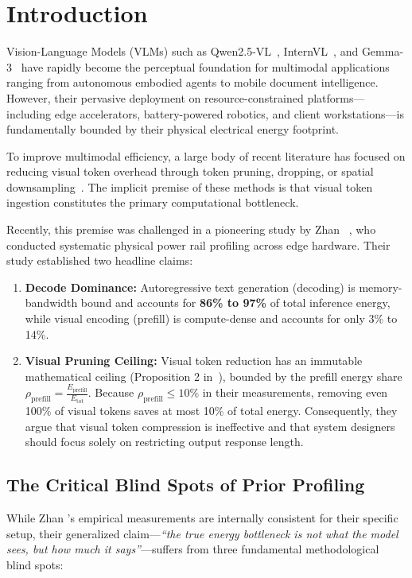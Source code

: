 \section{Introduction}
\label{sec:intro}

Vision-Language Models (VLMs) such as Qwen2.5-VL~\cite{qwen2_5_vl_2025}, InternVL~\cite{chen2024internvl}, and Gemma-3~\cite{gemma3_2025} have rapidly become the perceptual foundation for multimodal applications ranging from autonomous embodied agents to mobile document intelligence. However, their pervasive deployment on resource-constrained platforms---including edge accelerators, battery-powered robotics, and client workstations---is fundamentally bounded by their physical electrical energy footprint.

To improve multimodal efficiency, a large body of recent literature has focused on reducing visual token overhead through token pruning, dropping, or spatial downsampling~\cite{chen2024fastv, zhang2024sparsevlm, yang2024visionzip, vasu2025fastvlm}. The implicit premise of these methods is that visual token ingestion constitutes the primary computational bottleneck.

Recently, this premise was challenged in a pioneering study by Zhan \etal~\cite{zhan2026seeing}, who conducted systematic physical power rail profiling across edge hardware. Their study established two headline claims:
\begin{enumerate}[leftmargin=*]
    \item \textbf{Decode Dominance:} Autoregressive text generation (decoding) is memory-bandwidth bound and accounts for \textbf{86\% to 97\%} of total inference energy, while visual encoding (prefill) is compute-dense and accounts for only 3\% to 14\%.
    \item \textbf{Visual Pruning Ceiling:} Visual token reduction has an immutable mathematical ceiling (Proposition 2 in~\cite{zhan2026seeing}), bounded by the prefill energy share $\rho_{\text{prefill}} = \frac{E_{\text{prefill}}}{E_{\text{tot}}}$. Because $\rho_{\text{prefill}} \le 10\%$ in their measurements, removing even 100\% of visual tokens saves at most 10\% of total energy. Consequently, they argue that visual token compression is ineffective and that system designers should focus solely on restricting output response length.
\end{enumerate}

\subsection{The Critical Blind Spots of Prior Profiling}
While Zhan \etal's empirical measurements are internally consistent for their specific setup, their generalized claim---\emph{``the true energy bottleneck is not what the model sees, but how much it says''}---suffers from three fundamental methodological blind spots:

